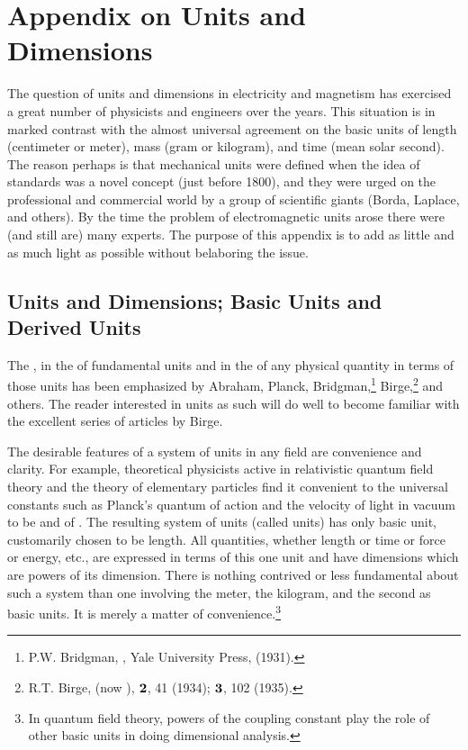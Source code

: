 \appendix
\chapter*{Appendix on Units and Dimensions}
\renewcommand{\thechapter}{A}
\setcounter{equation}{0}	        %

The question of units and dimensions in electricity and magnetism has exercised a great number of physicists and engineers over the years. This situation is in marked contrast with the almost universal agreement on the basic units of length (centimeter or meter), mass (gram or kilogram), and time (mean solar second). The reason perhaps is that mechanical units were defined when the idea of  standards was a novel concept (just before 1800), and they were urged on the professional and commercial world by a group of scientific giants (Borda, Laplace, and others). By the time the problem of electromagnetic units arose there were (and still are) many experts. The purpose of this appendix is to add as little and as much light as possible without belaboring the issue.

\section{Units and Dimensions; Basic Units and\\ Derived Units}\label{sec:A.1}

The , in the  of fundamental units and in the  of any physical quantity in terms of those units has been emphasized by Abraham, Planck, Bridgman,\footnote[1]{P.W. Bridgman, , Yale University Press,  (1931).} Birge,\footnote[2]{R.T. Birge,  (now ), $\vb{2}$, 41 (1934); $\vb{3}$, 102 (1935).} and others. The reader interested in units as such will do well to become familiar with the excellent series of articles by Birge.

The desirable features of a system of units in any field are convenience and clarity. For example, theoretical physicists active in relativistic quantum field theory and the theory of elementary particles find it convenient to 
the universal constants such as Planck's quantum of action and the velocity of light in vacuum to be 
and of . The resulting system of units (called  units) has only  basic unit, customarily chosen to be length. All quantities, whether length or time or force or energy, etc., are expressed in terms of this one unit and have dimensions which are powers of its dimension. There is nothing contrived or less fundamental about such a system than one involving the meter, the kilogram, and the second as basic units. It is merely a matter of convenience.\footnote[3]{In quantum field theory, powers of the coupling constant play the role of other basic units in doing dimensional analysis.} 

